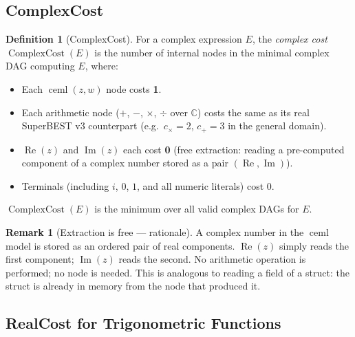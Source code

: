 \documentclass[12pt,a4paper]{article}
\theoremstyle{definition}
\newtheorem{definition}[theorem]{Definition}
\newtheorem{remark}[theorem]{Remark}
\newcommand{\ceml}{\operatorname{ceml}}
\newcommand{\CC}{\operatorname{ComplexCost}}
\begin{document}
\subsection{ComplexCost}

\begin{definition}[ComplexCost]
\label{def:CC}
For a complex expression $E$, the \emph{complex cost} $\CC(E)$ is the number
of internal nodes in the minimal complex DAG computing $E$, where:
\begin{itemize}
  \item Each $\ceml(z,w)$ node costs \textbf{1}.
  \item Each arithmetic node ($+$, $-$, $\times$, $\div$ over $\mathbb{C}$)
        costs the same as its real SuperBEST v3 counterpart
        (e.g.\ $c_{\times} = 2$, $c_{+} = 3$ in the general domain).
  \item $\operatorname{Re}(z)$ and $\operatorname{Im}(z)$ each cost \textbf{0}
        (free extraction: reading a pre-computed component of a complex number
        stored as a pair $(\operatorname{Re}, \operatorname{Im})$).
  \item Terminals (including $i$, $0$, $1$, and all numeric literals) cost 0.
\end{itemize}
$\CC(E)$ is the minimum over all valid complex DAGs for $E$.
\end{definition}

\begin{remark}[Extraction is free — rationale]
A complex number in the $\ceml$ model is stored as an ordered pair of real
components.
$\operatorname{Re}(z)$ simply reads the first component; $\operatorname{Im}(z)$
reads the second.
No arithmetic operation is performed; no node is needed.
This is analogous to reading a field of a struct: the struct is already in
memory from the node that produced it.
\end{remark}

\subsection{RealCost for Trigonometric Functions}
\end{document}
